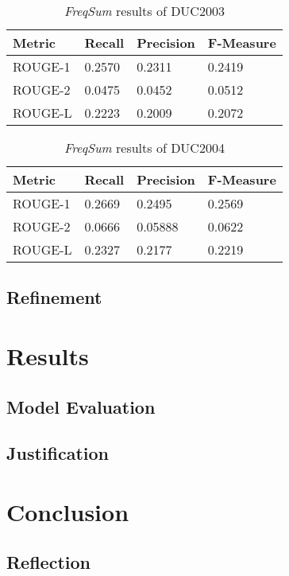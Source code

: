 \documentclass{article}
\begin{document}
\begin{table}[h]
    \centering
    \begin{tabular}{|l|l|l|l|}
        \hline
        Metric & Recall & Precision & F-Measure \\ \hline
        ROUGE-1 & 0.2570 & 0.2311 & 0.2419 \\ \hline
        ROUGE-2 & 0.0475 & 0.0452 & 0.0512 \\ \hline
        ROUGE-L & 0.2223 & 0.2009 &  0.2072 \\ \hline
    \end{tabular}
    \caption{\emph{FreqSum} results of DUC2003}
    \label{table:freqduc2003}
\end{table}

\begin{table}[h]
    \centering
    \begin{tabular}{|l|l|l|l|}
        \hline
        Metric & Recall & Precision & F-Measure \\ \hline
        ROUGE-1 & 0.2669 & 0.2495 & 0.2569 \\ \hline
        ROUGE-2 & 0.0666 & 0.05888 & 0.0622 \\ \hline
        ROUGE-L & 0.2327 & 0.2177 &  0.2219 \\ \hline
    \end{tabular}
    \caption{\emph{FreqSum} results of DUC2004}
    \label{table:freqduc2004}
\end{table}

\subsection{Refinement}

\section{Results}
\subsection{Model Evaluation}
\subsection{Justification}

\section{Conclusion}
\subsection{Reflection}
\end{document}
